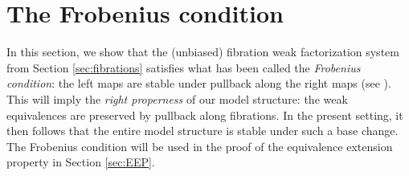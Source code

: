 \documentclass[11pt]{amsart}
\newcommand{\cSet}{\ensuremath{\mathsf{cSet}}}
\newcommand{\mono}{\ensuremath{\rightarrowtail}}
\newcommand{\ra}{\ensuremath{\rightarrow}}
\newcommand{\I}{\ensuremath{\mathrm{I}}}
\newtheorem{proposition}[theorem]{Proposition}
\theoremstyle{remark}
\newtheorem{remark}[theorem]{Remark}
\theoremstyle{definition}
\newtheorem{definition}[theorem]{Definition}
\begin{document}
%
%
%
%
%

\section{The Frobenius condition}\label{sec:Frobenius}

In this section, we show that the (unbiased) fibration weak factorization system from Section \ref{sec:fibrations} satisfies what has been called the \emph{Frobenius condition}: the left maps are stable under pullback along the right maps (see \cite{vdBG}).  This will imply the \emph{right properness} of our model structure: the weak equivalences are preserved by pullback along fibrations.  In the present setting, it then follows that the entire model structure is stable under such a base change.  The Frobenius condition will be used in the proof of the equivalence extension property in Section \ref{sec:EEP}.  
\end{document}
